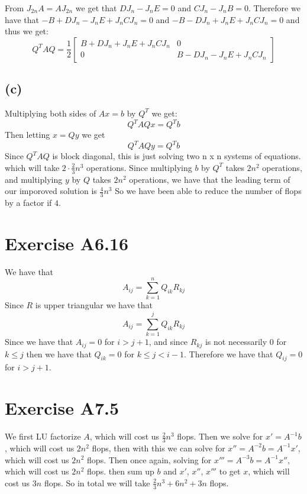 From $J_{2n}A=AJ_{2n}$ we get that $DJ_n-J_nE=0$ and 
$CJ_n-J_nB=0$. Therefore we have that $-B+DJ_n-J_nE+J_nCJ_n=0$
and $-B-DJ_n+J_nE+J_nCJ_n=0$ and thus we get:
$$Q^TAQ=\frac{1}{2} \begin{bmatrix}
        B+DJ_n+J_nE+J_nCJ_n & 0\\
        0 & B-DJ_n-J_nE+J_nCJ_n
    \end{bmatrix}$$
\subsection*{(c)}
Multiplying both sides of $Ax=b$ by $Q^T$ we get:
$$Q^TAQx=Q^Tb$$
Then letting $x=Qy$ we get
$$Q^TAQy=Q^Tb$$
Since $Q^TAQ$ is block diagonal, this is just solving
two n x n systems of equations. which will take $2\cdot\frac{2}{3}n^3$
operations. Since multiplying $b$ by $Q^T$ takes $2n^2$ operations,
and multiplying $y$ by $Q$ takes $2n^2$ operations, we have that
the leading term of our imporoved solution is $\frac{4}{3}n^3$ So
we have been able to reduce the number of flops by a factor if $4$.
\section*{Exercise A6.16}
We have that 
$$A_{ij}=\sum_{k=1}^n Q_{ik}R_{kj}$$
Since $R$ is upper triangular we have that 
$$A_{ij}=\sum_{k=1}^j Q_{ik}R_{kj}$$
Since we have that $A_{ij}=0$ for $i>j+1$, and since $R_{kj}$
is not necessarily $0$ for $k\leq j$ then we have that
$Q_{ik}=0$ for $k\leq j<i-1$. Therefore we have that
$Q_{ij}=0$ for $i>j+1$.  

\section*{Exercise A7.5}
We first LU factorize $A$, which will cost us $\frac{2}{3}n^3$ flops. 
Then we solve for $x'=A^{-1}b$, which will cost us $2n^2$ flops, then with this we can
solve for $x''=A^{-2}b=A^{-1}x'$, which will cost us $2n^2$ flops.
Then once again, solving for $x'''=A^{-3}b=A^{-1}x''$, which will cost us $2n^2$ flops.
then sum up $b$ and $x'$, $x''$, $x'''$ to get $x$, which will cost us 
$3n$ flops. So in total we will take $\boxed{\frac{2}{3}n^3+6n^2+3n}$ flops.
